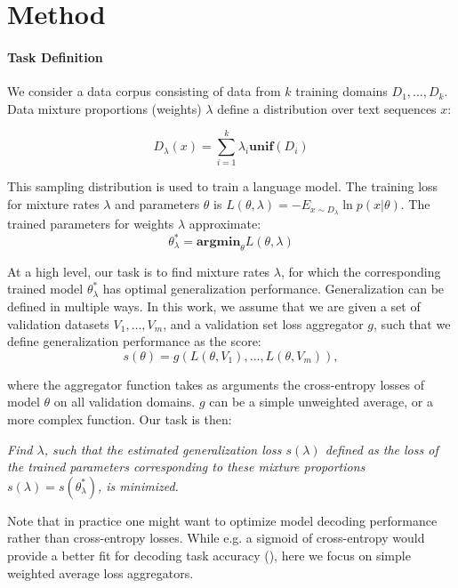 \section{Method}

\paragraph{Task Definition}

We consider a data corpus consisting of data from $k$ training domains $D_1,\ldots,D_k$. Data mixture proportions (weights) $\lambda$ define a distribution over text sequences $x$:

\vspace{-5pt}
\[ D_\lambda (x) = \sum_{i=1}^{k}\lambda_i  \mathbf{unif}(D_i) \]

\vspace{-5pt}
This sampling distribution is used to train a language model.  The  training loss for mixture rates $\lambda$ and parameters $\theta$ is $L(\theta,\lambda) = - E_{x \sim D_\lambda}\ln p(x|\theta)$. The trained parameters for weights $\lambda$ approximate: 
 \[ \theta^{*}_\lambda = \mathbf{argmin}_\theta L(\theta, \lambda) \]

\vspace{-5pt}
At a high level, our task is to find mixture rates $\lambda$, for which the corresponding trained model $\theta^{*}_\lambda$ has optimal generalization performance. Generalization can be defined in multiple ways. In this work, we assume that we are given a set of validation datasets $V_1,\ldots,V_m$, and a validation set loss aggregator $g$, such that we define generalization performance as the score:
\[ s(\theta) = g(L(\theta,V_1),\ldots,L(\theta,V_m)), \]

\noindent
where the aggregator function takes as arguments the cross-entropy losses of model $\theta$ on all validation domains. $g$ can be a simple unweighted average, or a more complex function. Our task is then:

\textit{Find $\lambda$, such that the estimated generalization loss $s(\lambda)$ defined as the loss of the trained parameters corresponding to these mixture proportions $s(\lambda) = s(\theta^{*}_\lambda)$, is minimized.}

Note that in practice one might want to  optimize model decoding performance rather than cross-entropy losses. While e.g. a sigmoid of cross-entropy would provide a better fit for decoding task accuracy (\citet{grattafiori2024llama3herdmodels}), here we focus on simple weighted average loss aggregators.


